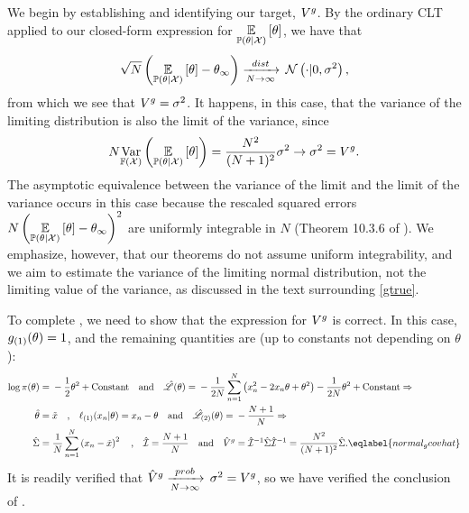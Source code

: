 We begin by establishing  and identifying our target,
$V^g$. By the ordinary CLT applied to our closed-form expression for
$\underset{\mathbb{P}(\theta | {\mathcal{X}})}{\mathbb{E}}\left[\theta\right]$, we have that
$$
\sqrt{N}\left(\underset{\mathbb{P}(\theta | {\mathcal{X}})}{\mathbb{E}}\left[\theta\right] - \theta_{\infty}\right) \xrightarrow[N\rightarrow\infty]{dist}\,
\mathcal{N}\left(\cdot \vert 0, \sigma^2 \right),
$$
from which we see that $V^g = \sigma^2$.  It happens, in this case, that
the variance of the limiting distribution is also the limit of the variance,
since
$$
N \underset{\mathbb{F}({\mathcal{X}})}{\mathrm{Var}}\left(\underset{\mathbb{P}(\theta | {\mathcal{X}})}{\mathbb{E}}\left[\theta\right]\right) =
    \frac{N^2}{(N+1)^2}\sigma^2 \rightarrow \sigma^2 = V^g.
$$
The asymptotic equivalence between the variance of the limit and the limit of
the variance occurs in this case because the rescaled squared errors
$N \left(\underset{\mathbb{P}(\theta | {\mathcal{X}})}{\mathbb{E}}\left[\theta\right] - \theta_{\infty}\right)^2$ are uniformly
integrable in $N$ (Theorem 10.3.6 of \citet{dudley:2018:realanalysis}).
%
We emphasize, however, that our theorems do
not assume uniform integrability, and we aim to estimate the variance of the
limiting normal distribution, not the limiting value of the variance, as
discussed in the text surrounding \eqref{gtrue}.

To complete , we need to show that the expression
for $V^g$ is correct. In this case, $g_{(1)}(\theta) = 1$, and the
remaining quantities are (up to constants not depending on
$\theta$):
\begin{align}
%
\log \pi(\theta) ={}& -\frac{1}{2}\theta^2 + \textrm{Constant}
\quad\textrm{and}\quad
\likhat(\theta) ={}
    -\frac{1}{2N} \sumn \left(x_n^2 - 2x_n \theta + \theta^2\right)
    -\frac{1}{2N} \theta^2 + \textrm{Constant} \Rightarrow \nonumber \\
\thetahat ={}& \xbar
\quad\textrm{,}\quad
\ellgrad{1}(\x_n \vert \theta) ={} x_n - \theta
\quad\textrm{and}\quad
\likhatk{2}(\theta) ={} -\frac{N+1}{N} \Rightarrow \nonumber \\
\scorecovhat ={}& \meann \left(x_n - \xbar\right)^2
\quad\textrm{,}\quad
\infohat ={} \frac{N+1}{N}
\quad\textrm{and}\quad
\gcovhat ={} \infohat^{-1} \scorecovhat \infohat^{-1} =
    \frac{N^2}{(N + 1)^2} \scorecovhat.
\eqlabel{normal_gcovhat}
%
\end{align}
%
It is readily verified that $\hat{V}^{g} \xrightarrow[N\rightarrow\infty]{prob}\, \sigma^2 = V^g$,
so we have verified the conclusion of .

